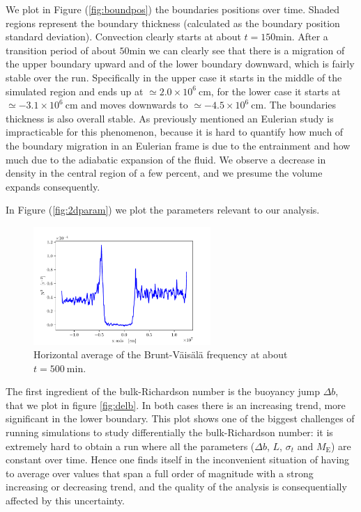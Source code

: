 We plot in Figure (\ref{fig:boundpos}) the boundaries positions over time. Shaded regions represent the boundary thickness (calculated as the boundary position standard deviation). Convection clearly starts at about $t=150 \mathrm{min}$. After a transition period of about $50 \mathrm{min}$ we can clearly see that there is a migration of the upper boundary upward and of the lower boundary downward, which is fairly stable over the run. Specifically in the upper case it starts in the middle of the simulated region and ends up at $\simeq 2.0 \times 10^{6} \ \mathrm{cm}$, for the lower case it starts at $\simeq - 3.1 \times 10^{6} \ \mathrm{cm}$ and moves downwards to $\simeq - 4.5 \times 10^{6} \ \mathrm{cm}$. The boundaries thickness is also overall stable. As previously mentioned an Eulerian study is impracticable for this phenomenon, because it is hard to quantify how much of the boundary migration in an Eulerian frame is due to the entrainment and how much due to the adiabatic expansion of the fluid. We observe a decrease in density in the central region of a few percent, and we presume the volume expands consequently. 

In Figure (\ref{fig:2dparam}) we plot the parameters relevant to our analysis. 
\begin{figure}[t!]
\centering
\includegraphics[width=0.6\textwidth]{./img/brunt}
\caption{Horizontal average of the Brunt-Väisälä frequency at about $t=500 \ \mathrm{min}$.}
\label{fig:brunt}
\end{figure}
The first ingredient of the bulk-Richardson number is the buoyancy jump $\Delta b$, that we plot in figure \ref{fig:delb}. In both cases there is an increasing trend, more significant in the lower boundary. This plot shows one of the biggest challenges of running simulations to study differentially the bulk-Richardson number: it is extremely hard to obtain a run where all the parameters ($\Delta b$, $L$, $\sigma_t$ and $M_{\mathrm{E}}$) are constant over time. Hence one finds itself in the inconvenient situation of having to average over values that span a full order of magnitude with a strong increasing or decreasing trend, and the quality of the analysis is consequentially affected by this uncertainty. 

